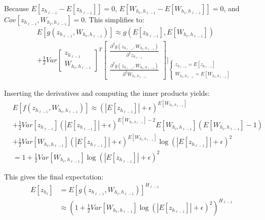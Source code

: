 Because $E[z_{h_{\ell-1}} - E[z_{h_{\ell-1}}]] = 0$, $E[W_{h_{\ell}, h_{\ell-1}} - E[W_{h_{\ell}, h_{\ell-1}}]] = 0$, and $Cov[z_{h_{\ell-1}}, W_{h_{\ell}, h_{\ell-1}}] = 0$. This simplifies to:
\begin{equation}
\begin{aligned}
&E[g(z_{h_{\ell-1}}, W_{h_{\ell}, h_{\ell-1}})] \approx
g(E[z_{h_{\ell-1}}], E[W_{h_{\ell}, h_{\ell-1}}])\\
&+ \frac{1}{2} Var\begin{bmatrix}
z_{h_{\ell-1}} \\ W_{h_{\ell}, h_{\ell-1}}
\end{bmatrix}^T \begin{bmatrix}
\frac{\partial^2 g(z_{h_{\ell-1}}, W_{h_{\ell}, h_{\ell-1}})}{\partial^2 z_{h_{\ell-1}}} \\
\frac{\partial^2 g(z_{h_{\ell-1}}, W_{h_{\ell}, h_{\ell-1}})}{\partial^2 W_{h_{\ell}, h_{\ell-1}}}
\end{bmatrix} \Bigg\rvert_{
\begin{cases}
z_{h_{\ell-1}} = E[z_{h_{\ell-1}}] \\
W_{h_{\ell}, h_{\ell-1}} = E[W_{h_{\ell}, h_{\ell-1}}]
\end{cases}
}
\end{aligned}
\end{equation}

Inserting the derivatives and computing the inner products yields:
\begin{equation}
\begin{aligned}
&E[f(z_{h_{\ell-1}}, W_{h_{\ell}, h_{\ell-1}})] \approx
(|E[z_{h_{\ell-1}}]| + \epsilon)^{E[W_{h_{\ell}, h_{\ell-1}}]} \\
&+ \frac{1}{2} Var[z_{h_{\ell-1}}] (|E[z_{h_{\ell-1}}]| + \epsilon)^{E[W_{h_{\ell}, h_{\ell-1}}] - 2} E[W_{h_{\ell}, h_{\ell-1}}] (E[W_{h_{\ell}, h_{\ell-1}}] - 1) \\
&+ \frac{1}{2} Var[W_{h_{\ell}, h_{\ell-1}}] (|E[z_{h_{\ell-1}}]| + \epsilon)^{E[W_{h_{\ell}, h_{\ell-1}}]} \log(|E[z_{h_{\ell-1}}]| + \epsilon)^2 \\
&=1 + \frac{1}{2} Var[W_{h_{\ell}, h_{\ell-1}}] \log(|E[z_{h_{\ell-1}}]| + \epsilon)^2
\end{aligned}
\label{eq:appendix:nac:forward-pass:expectation:taylor}
\end{equation}

This gives the final expectation:
\begin{equation}
\begin{aligned}
E[z_{h_\ell}] &= E\left[g(z_{h_{\ell-1}}, W_{h_{\ell}, h_{\ell-1}})\right]^{H_{\ell-1}} \\
&\approx\left(1 + \frac{1}{2} Var[W_{h_{\ell}, h_{\ell-1}}] \log(|E[z_{h_{\ell-1}}]| + \epsilon)^2\right)^{H_{\ell-1}}
\end{aligned}
\end{equation}

